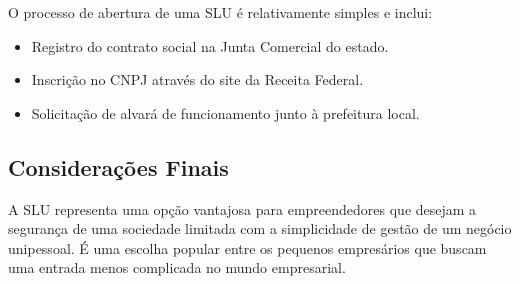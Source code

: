 O processo de abertura de uma SLU é relativamente simples e inclui:
\begin{itemize}
    \item Registro do contrato social na Junta Comercial do estado.
    \item Inscrição no CNPJ através do site da Receita Federal.
    \item Solicitação de alvará de funcionamento junto à prefeitura local.
\end{itemize}

\subsection{Considerações Finais}

A SLU representa uma opção vantajosa para empreendedores que desejam a segurança de uma sociedade limitada com a simplicidade de gestão de um negócio unipessoal. É uma escolha popular entre os pequenos empresários que buscam uma entrada menos complicada no mundo empresarial.
